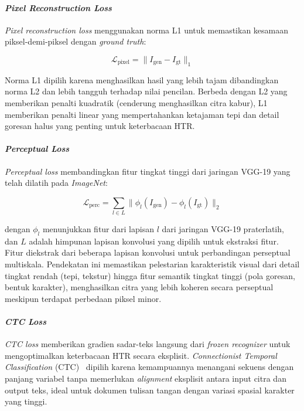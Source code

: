 \paragraph{\textit{Pixel Reconstruction Loss}}

\textit{Pixel reconstruction loss} menggunakan norma L1 untuk memastikan kesamaan piksel-demi-piksel dengan \textit{ground truth}:

\begin{equation}
  \mathcal{L}_{\text{pixel}} = \|I_{\text{gen}} - I_{\text{gt}}\|_1
  \label{eq:IV.15}
\end{equation}

Norma L1 dipilih karena menghasilkan hasil yang lebih tajam dibandingkan norma L2 dan lebih tangguh terhadap nilai pencilan. Berbeda dengan L2 yang memberikan penalti kuadratik (cenderung menghasilkan citra kabur), L1 memberikan penalti linear yang mempertahankan ketajaman tepi dan detail goresan halus yang penting untuk keterbacaan HTR.

\paragraph{\textit{Perceptual Loss}}

\textit{Perceptual loss} \parencite{johnson2016} membandingkan fitur tingkat tinggi dari jaringan VGG-19 yang telah dilatih pada \textit{ImageNet}:

\begin{equation}
  \mathcal{L}_{\text{perc}} = \sum_{l \in L} \|\phi_l(I_{\text{gen}}) - \phi_l(I_{\text{gt}})\|_2
  \label{eq:IV.16}
\end{equation}

dengan $\phi_l$ menunjukkan fitur dari lapisan $l$ dari jaringan VGG-19 praterlatih, dan $L$ adalah himpunan lapisan konvolusi yang dipilih untuk ekstraksi fitur. Fitur diekstrak dari beberapa lapisan konvolusi untuk perbandingan perseptual multiskala. Pendekatan ini memastikan pelestarian karakteristik visual dari detail tingkat rendah (tepi, tekstur) hingga fitur semantik tingkat tinggi (pola goresan, bentuk karakter), menghasilkan citra yang lebih koheren secara perseptual meskipun terdapat perbedaan piksel minor.

\paragraph{\textit{CTC Loss}}

\textit{CTC loss} memberikan gradien sadar-teks langsung dari \textit{frozen recognizer} untuk mengoptimalkan keterbacaan HTR secara eksplisit. \textit{Connectionist Temporal Classification} (CTC)~\parencite{graves2006} dipilih karena kemampuannya menangani sekuens dengan panjang variabel tanpa memerlukan \textit{alignment} eksplisit antara input citra dan output teks, ideal untuk dokumen tulisan tangan dengan variasi spasial karakter yang tinggi.


